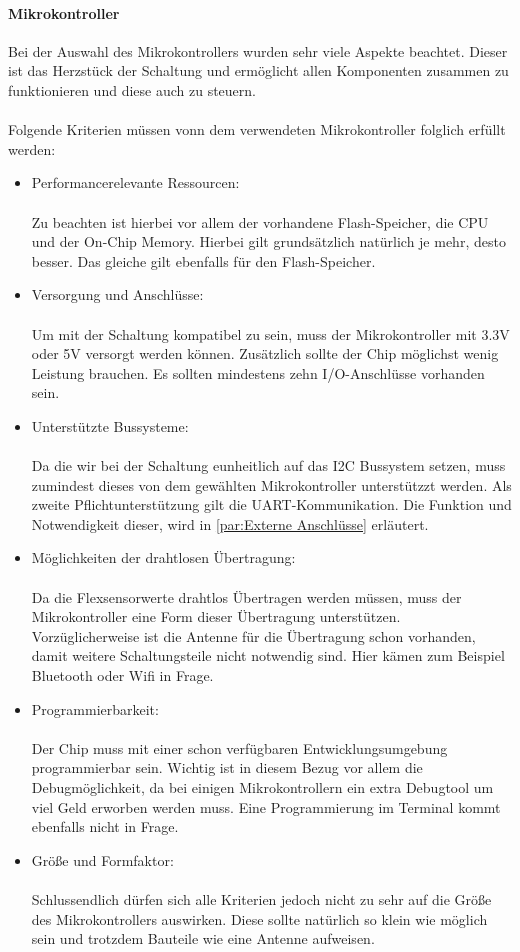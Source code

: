 \documentclass[titlepage,12pt,twoside]{article}
\begin{document}
\paragraph{Mikrokontroller}
\label{par:Mikrokontroller}
\hfill \break
\hfill \break
Bei der Auswahl des Mikrokontrollers wurden sehr viele Aspekte beachtet. Dieser ist das Herzstück der Schaltung und ermöglicht
allen Komponenten zusammen zu funktionieren und diese auch zu steuern. \\
\\
Folgende Kriterien müssen vonn dem verwendeten Mikrokontroller folglich erfüllt werden:
\begin{itemize}
	\item Performancerelevante Ressourcen: \\
		  \\
		  Zu beachten ist hierbei vor allem der vorhandene Flash-Speicher, die CPU und der On-Chip Memory. Hierbei gilt grundsätzlich 
		  natürlich je mehr, desto besser. Das gleiche gilt ebenfalls für den Flash-Speicher.
	\item Versorgung und Anschlüsse: \\
		  \\
		  Um mit der Schaltung kompatibel zu sein, muss der Mikrokontroller mit 3.3V oder 5V versorgt werden können. Zusätzlich
		  sollte der Chip möglichst wenig Leistung brauchen. Es sollten mindestens zehn I/O-Anschlüsse vorhanden sein.
	\item Unterstützte Bussysteme: \\
		  \\
		  Da die wir bei der Schaltung eunheitlich auf das I2C Bussystem setzen, muss zumindest dieses von dem gewählten Mikrokontroller
		  unterstützzt werden. Als zweite Pflichtunterstützung gilt die UART-Kommunikation. Die Funktion und Notwendigkeit dieser,
		  wird in \autoref{par:Externe Anschlüsse} erläutert.
	\item Möglichkeiten der drahtlosen Übertragung: \\
		  \\
		  Da die Flexsensorwerte drahtlos Übertragen werden müssen, muss der Mikrokontroller eine Form dieser Übertragung unterstützen.
		  Vorzüglicherweise ist die Antenne für die Übertragung schon vorhanden, damit weitere Schaltungsteile nicht notwendig sind.
		  Hier kämen zum Beispiel Bluetooth oder Wifi in Frage.
	\item Programmierbarkeit: \\
		  \\
		  Der Chip muss mit einer schon verfügbaren Entwicklungsumgebung programmierbar sein. Wichtig ist in diesem Bezug vor allem
		  die Debugmöglichkeit, da bei einigen Mikrokontrollern ein extra Debugtool um viel Geld erworben werden muss. Eine Programmierung
		  im Terminal kommt ebenfalls nicht in Frage.
	\item Größe und Formfaktor: \\
		  \\
		  Schlussendlich dürfen sich alle Kriterien jedoch nicht zu sehr auf die Größe des Mikrokontrollers auswirken. Diese sollte
		  natürlich so klein wie möglich sein und trotzdem Bauteile wie eine Antenne aufweisen.
\end{itemize}
\end{document}
